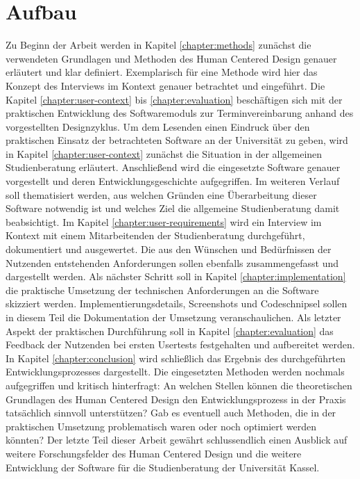 \section{Aufbau}
Zu Beginn der Arbeit werden in Kapitel \ref{chapter:methods} zunächst die
verwendeten Grundlagen und Methoden des Human Centered Design genauer erläutert
und klar definiert. Exemplarisch für eine Methode wird hier das Konzept des
Interviews im Kontext genauer betrachtet und eingeführt. Die
Kapitel \ref{chapter:user-context} bis \ref{chapter:evaluation} beschäftigen sich
mit der praktischen Entwicklung des Softwaremoduls zur Terminvereinbarung
anhand des vorgestellten Designzyklus. Um dem Lesenden einen Eindruck über den
praktischen Einsatz der betrachteten Software an der Universität zu geben, wird
in Kapitel \ref{chapter:user-context} zunächst die Situation in der allgemeinen
Studienberatung erläutert. Anschließend wird die eingesetzte Software genauer
vorgestellt und deren Entwicklungsgeschichte aufgegriffen. Im weiteren Verlauf
soll thematisiert werden, aus welchen Gründen eine Überarbeitung dieser
Software notwendig ist und welches Ziel die allgemeine Studienberatung damit
beabsichtigt. Im Kapitel  \ref{chapter:user-requirements} wird ein Interview im
Kontext mit einem Mitarbeitenden der Studienberatung durchgeführt, dokumentiert
und ausgewertet. Die aus den Wünschen und Bedürfnissen der Nutzenden
entstehenden Anforderungen sollen ebenfalls zusammengefasst und dargestellt
werden. Als nächster Schritt soll in Kapitel \ref{chapter:implementation} die
praktische Umsetzung der technischen Anforderungen an die Software skizziert
werden. Implementierungsdetails, Screenshots und Codeschnipsel sollen in diesem
Teil die Dokumentation der Umsetzung veranschaulichen. Als letzter Aspekt der
praktischen Durchführung soll in Kapitel \ref{chapter:evaluation} das Feedback
der Nutzenden bei ersten \glspl{Usertest} festgehalten und aufbereitet werden. In
Kapitel \ref{chapter:conclusion} wird schließlich das Ergebnis des
durchgeführten Entwicklungsprozesses dargestellt. Die eingesetzten Methoden
werden nochmals aufgegriffen und kritisch hinterfragt: An welchen Stellen
können die theoretischen Grundlagen des Human Centered Design den
Entwicklungsprozess in der Praxis tatsächlich sinnvoll unterstützen? Gab es
eventuell auch Methoden, die in der praktischen Umsetzung problematisch waren
oder noch optimiert werden könnten? Der letzte Teil dieser Arbeit gewährt
schlussendlich einen Ausblick auf weitere Forschungsfelder des Human Centered
Design und die weitere Entwicklung der Software für die Studienberatung der
Universität Kassel.